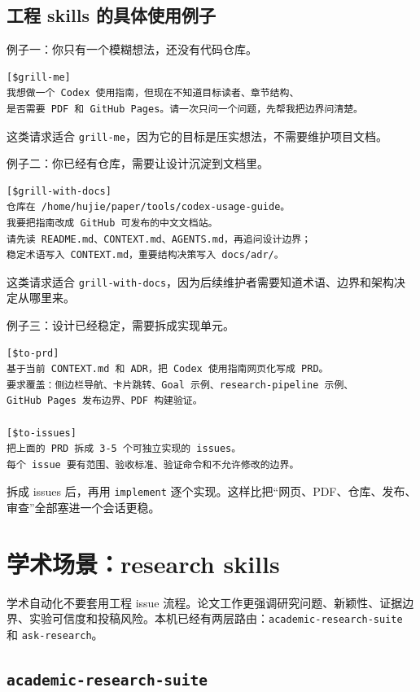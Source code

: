 \documentclass[UTF8,a4paper,11pt,fontset=none]{ctexart}
\newcommand{\skill}[1]{\texttt{#1}}
\begin{document}
\subsection{工程 skills 的具体使用例子}

例子一：你只有一个模糊想法，还没有代码仓库。

\begin{lstlisting}
[$grill-me]
我想做一个 Codex 使用指南，但现在不知道目标读者、章节结构、
是否需要 PDF 和 GitHub Pages。请一次只问一个问题，先帮我把边界问清楚。
\end{lstlisting}

这类请求适合 \skill{grill-me}，因为它的目标是压实想法，不需要维护项目文档。

例子二：你已经有仓库，需要让设计沉淀到文档里。

\begin{lstlisting}
[$grill-with-docs]
仓库在 /home/hujie/paper/tools/codex-usage-guide。
我要把指南改成 GitHub 可发布的中文文档站。
请先读 README.md、CONTEXT.md、AGENTS.md，再追问设计边界；
稳定术语写入 CONTEXT.md，重要结构决策写入 docs/adr/。
\end{lstlisting}

这类请求适合 \skill{grill-with-docs}，因为后续维护者需要知道术语、边界和架构决定从哪里来。

例子三：设计已经稳定，需要拆成实现单元。

\begin{lstlisting}
[$to-prd]
基于当前 CONTEXT.md 和 ADR，把 Codex 使用指南网页化写成 PRD。
要求覆盖：侧边栏导航、卡片跳转、Goal 示例、research-pipeline 示例、
GitHub Pages 发布边界、PDF 构建验证。

[$to-issues]
把上面的 PRD 拆成 3-5 个可独立实现的 issues。
每个 issue 要有范围、验收标准、验证命令和不允许修改的边界。
\end{lstlisting}

拆成 issues 后，再用 \skill{implement} 逐个实现。这样比把“网页、PDF、仓库、发布、审查”全部塞进一个会话更稳。

\section{学术场景：research skills}

学术自动化不要套用工程 issue 流程。论文工作更强调研究问题、新颖性、证据边界、实验可信度和投稿风险。本机已经有两层路由：\skill{academic-research-suite} 和 \skill{ask-research}。

\subsection{\skill{academic-research-suite}}
\end{document}
